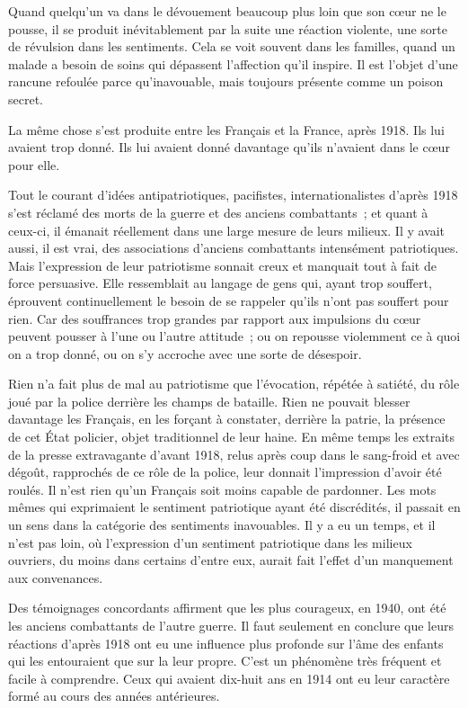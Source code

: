 \documentclass[french,twoside]{book} %
\begin{document}
Quand quelqu'un va dans le dévouement beaucoup plus loin que son cœur ne le pousse, il se produit inévitablement par la suite une réaction violente, une sorte de révulsion dans les sentiments. Cela se voit souvent dans les familles, quand un malade a besoin de soins qui dépassent l'affection qu'il inspire. Il est l'objet d'une rancune refoulée parce qu'inavouable, mais toujours présente comme un poison secret.\par
La même chose s'est produite entre les Français et la France, après 1918. Ils lui avaient trop donné. Ils lui avaient donné davantage qu'ils n'avaient dans le cœur pour elle.\par
Tout le courant d'idées antipatriotiques, pacifistes, internationalistes d'après 1918 s'est réclamé des morts de la guerre et des anciens combattants ; et quant à ceux-ci, il émanait réellement dans une large mesure de leurs milieux. Il y avait aussi, il est vrai, des associations d'anciens combattants intensément patriotiques. Mais l'expression de leur patriotisme sonnait creux et manquait tout à fait de force persuasive. Elle ressemblait au langage de gens qui, ayant trop souffert, éprouvent continuellement le besoin de se rappeler qu'ils n'ont pas souffert pour rien. Car des souffrances trop grandes par rapport aux impulsions du cœur peuvent pousser à l'une ou l'autre attitude ; ou on repousse violemment ce à quoi on a trop donné, ou on s'y accroche avec une sorte de désespoir.\par
Rien n'a fait plus de mal au patriotisme que l'évocation, répétée à satiété, du rôle joué par la police derrière les champs de bataille. Rien ne pouvait blesser davantage les Français, en les forçant à constater, derrière la patrie, la présence de cet État policier, objet traditionnel de leur haine. En même temps les extraits de la presse extravagante d'avant 1918, relus après coup dans le sang-froid et avec dégoût, rapprochés de ce rôle de la police, leur donnait l'impression d'avoir été roulés. Il n'est rien qu'un Français soit moins capable de pardonner. Les mots mêmes qui exprimaient le sentiment patriotique ayant été discrédités, il passait en un sens dans la catégorie des sentiments inavouables. Il y a eu un temps, et il n'est pas loin, où l'expression d'un sentiment patriotique dans les milieux ouvriers, du moins dans certains d'entre eux, aurait fait l'effet d'un manquement aux convenances.\par
\par
Des témoignages concordants affirment que les plus courageux, en 1940, ont été les anciens combattants de l'autre guerre. Il faut seulement en conclure que leurs réactions d'après 1918 ont eu une influence plus profonde sur l'âme des enfants qui les entouraient que sur la leur propre. C'est un phénomène très fréquent et facile à comprendre. Ceux qui avaient dix-huit ans en 1914 ont eu leur caractère formé au cours des années antérieures.\par
\end{document}
